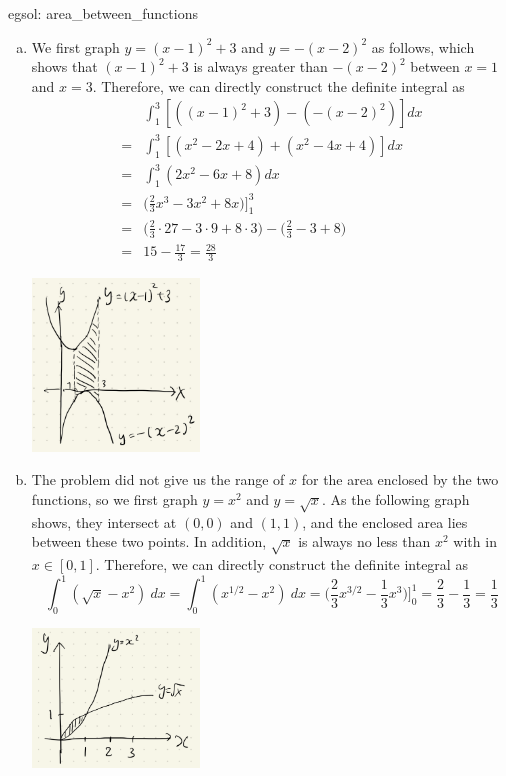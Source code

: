 \begin{egsol}[]{egsol: area_between_functions}
    \begin{enumerate}[a)]
        \item We first graph $y = (x-1)^2 +3$ and $y = -(x-2)^2$ as follows, which shows that $(x-1)^2 +3$ is always greater than $-(x-2)^2$ between $x = 1$ and $x = 3$.  Therefore, we can directly construct the definite integral as
        \begin{align*}
            &\int_1^3 [((x-1)^2 + 3) - (-(x-2)^2)]dx\\
            =& \int_1^3 [(x^2-2x+4)+(x^2-4x+4)]dx\\
            =& \int_1^3 (2x^2-6x+8) dx\\
            =& \Big(\frac{2}{3}x^3 - 3x^2 + 8x \Big)\Big]_1^3\\
            =& \Big(\frac{2}{3}\cdot 27 - 3 \cdot 9 + 8 \cdot 3 \Big) - \Big(\frac{2}{3} - 3 + 8 \Big)\\
            =& 15 - \frac{17}{3} = \frac{28}{3} 
        \end{align*}
        \begin{center}
            \includegraphics[width = 0.35\textwidth]{figures/chap 07/eg_7_3_a.png}
        \end{center}
        \item The problem did not give us the range of $x$ for the area enclosed by the two functions, so we first graph $y = x^2$ and $y = \sqrt{x}$.  As the following graph shows, they intersect at $(0,0)$ and $(1,1)$, and the enclosed area lies between these two points.  In addition, $\sqrt{x}$ is always no less than $x^2$ with in $x \in [0,1]$.  Therefore, we can directly construct the definite integral as
        \[\int_0^1(\sqrt{x} - x^2)~dx = \int_0^1(x^{1/2} - x^2)~dx = \Big(\frac{2}{3}x^{3/2} - \frac{1}{3}x^3\Big)\Big]_0^1 = \frac{2}{3} - \frac{1}{3} = \frac{1}{3}\]
        \begin{center}
            \includegraphics[width = 0.35\textwidth]{figures/chap 07/eg_7_3_b.png}

\end{center}
\end{enumerate}
\end{egsol}
